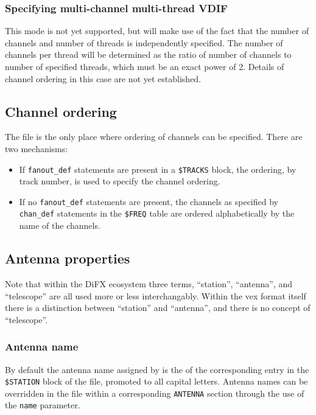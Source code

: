 \documentclass[12pt]{article}
\begin{document}
\subsubsection{Specifying multi-channel multi-thread VDIF}

This mode is not yet supported, but will make use of the fact that the number of channels and number of threads is independently specified.
The number of channels per thread will be determined as the ratio of number of channels to number of specified threads, which must be an exact power of 2.
Details of channel ordering in this case are not yet established.

\subsection{Channel ordering} \label{sec:channels}

The \vx file is the only place where ordering of channels can be specified.
There are two mechanisms:
\begin{itemize}
\item If {\tt fanout\_def} statements are present in a {\tt \$TRACKS} block, the ordering, by track number, is used to specify the channel ordering.
\item If no {\tt fanout\_def} statements are present, the channels as specified by {\tt chan\_def} statements in the {\tt \$FREQ} table are ordered alphabetically by the name of the channels.
\end{itemize}


\subsection{Antenna properties}

Note that within the DiFX ecosystem three terms, ``station'', ``antenna'', and ``telescope'' are all used more or less interchangably.
Within the vex format itself there is a distinction between ``station'' and ``antenna'', and there is no concept of ``telescope''.

\subsubsection{Antenna name}

By default the antenna name assigned by \vexdifx is the  of the corresponding entry in the {\tt \$STATION} block of the \vx file, promoted to all capital letters.
Antenna names can be overridden in the \vd file within a corresponding {\tt ANTENNA} section through the use of the {\tt name} parameter.
\end{document}
